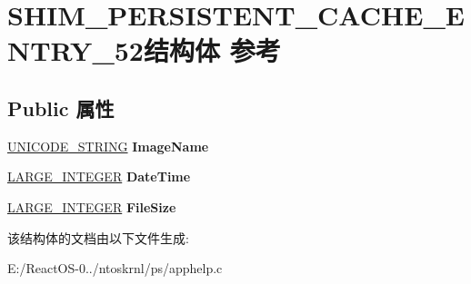 \hypertarget{struct_s_h_i_m___p_e_r_s_i_s_t_e_n_t___c_a_c_h_e___e_n_t_r_y__52}{}\section{S\+H\+I\+M\+\_\+\+P\+E\+R\+S\+I\+S\+T\+E\+N\+T\+\_\+\+C\+A\+C\+H\+E\+\_\+\+E\+N\+T\+R\+Y\+\_\+52结构体 参考}
\label{struct_s_h_i_m___p_e_r_s_i_s_t_e_n_t___c_a_c_h_e___e_n_t_r_y__52}
\subsection*{Public 属性}
\begin{DoxyCompactItemize}
\item 
\mbox{\label{struct_s_h_i_m___p_e_r_s_i_s_t_e_n_t___c_a_c_h_e___e_n_t_r_y__52_a1f433d3e544201b3083d98d8d90d6bf6}} 
\hyperlink{struct___u_n_i_c_o_d_e___s_t_r_i_n_g}{U\+N\+I\+C\+O\+D\+E\+\_\+\+S\+T\+R\+I\+NG} {\bfseries Image\+Name}
\item 
\mbox{\label{struct_s_h_i_m___p_e_r_s_i_s_t_e_n_t___c_a_c_h_e___e_n_t_r_y__52_ab571f992b654b72fad904f4c0966dced}} 
\hyperlink{union___l_a_r_g_e___i_n_t_e_g_e_r}{L\+A\+R\+G\+E\+\_\+\+I\+N\+T\+E\+G\+ER} {\bfseries Date\+Time}
\item 
\mbox{\label{struct_s_h_i_m___p_e_r_s_i_s_t_e_n_t___c_a_c_h_e___e_n_t_r_y__52_ad1f77c99ca0922cc240211392cfe8ef4}} 
\hyperlink{union___l_a_r_g_e___i_n_t_e_g_e_r}{L\+A\+R\+G\+E\+\_\+\+I\+N\+T\+E\+G\+ER} {\bfseries File\+Size}
\end{DoxyCompactItemize}


该结构体的文档由以下文件生成\+:\begin{DoxyCompactItemize}
\item 
E\+:/\+React\+O\+S-\/0../ntoskrnl/ps/apphelp.\+c\end{DoxyCompactItemize}
